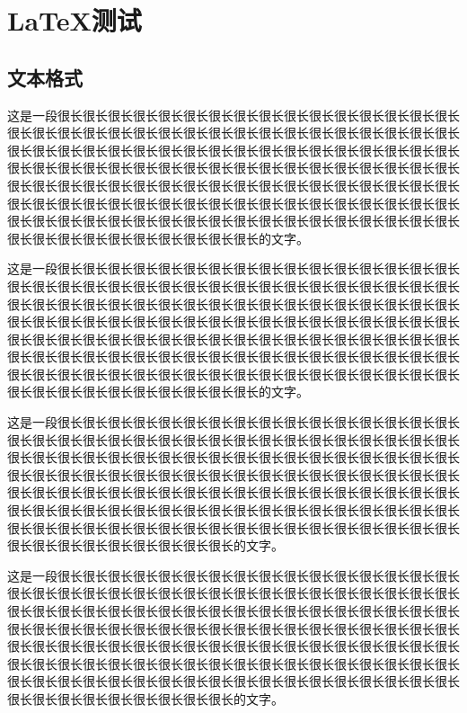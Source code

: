\chapter{\LaTeX 测试}
\section{文本格式}
这是一段很长很长很长很长很长很长很长很长很长很长很长很长很长很长很长很长很长很长很长很长很长很长很长很长很长很长很长很长很长很长很长很长很长很长很长很长很长很长很长很长很长很长很长很长很长很长很长很长很长很长很长很长很长很长很长很长很长很长很长很长很长很长很长很长很长很长很长很长很长很长很长很长很长很长很长很长很长很长很长很长很长很长很长很长很长很长很长很长很长很长很长很长很长很长很长很长很长很长很长很长很长很长很长很长很长很长很长很长很长很长很长很长很长很长很长很长很长很长很长很长很长很长很长很长很长很长很长很长很长很长很长很长很长很长的文字。

这是一段很长很长很长很长很长很长很长很长很长很长很长很长很长很长很长很长很长很长很长很长很长很长很长很长很长很长很长很长很长很长很长很长很长很长很长很长很长很长很长很长很长很长很长很长很长很长很长很长很长很长很长很长很长很长很长很长很长很长很长很长很长很长很长很长很长很长很长很长很长很长很长很长很长很长很长很长很长很长很长很长很长很长很长很长很长很长很长很长很长很长很长很长很长很长很长很长很长很长很长很长很长很长很长很长很长很长很长很长很长很长很长很长很长很长很长很长很长很长很长很长很长很长很长很长很长很长很长很长很长很长很长很长很长很长的文字。

这是一段很长很长很长很长很长很长很长很长很长很长很长很长很长很长很长很长很长很长很长很长很长很长很长很长很长很长很长很长很长很长很长很长很长很长很长很长很长很长很长很长很长很长很长很长很长很长很长很长很长很长很长很长很长很长很长很长很长很长很长很长很长很长很长很长很长很长很长很长很长很长很长很长很长很长很长很长很长很长很长很长很长很长很长很长很长很长很长很长很长很长很长很长很长很长很长很长很长很长很长很长很长很长很长很长很长很长很长很长很长很长很长很长很长很长很长很长很长很长很长很长很长很长很长很长很长很长很长很长很长很长很长很长很长的文字。

这是一段很长很长很长很长很长很长很长很长很长很长很长很长很长很长很长很长很长很长很长很长很长很长很长很长很长很长很长很长很长很长很长很长很长很长很长很长很长很长很长很长很长很长很长很长很长很长很长很长很长很长很长很长很长很长很长很长很长很长很长很长很长很长很长很长很长很长很长很长很长很长很长很长很长很长很长很长很长很长很长很长很长很长很长很长很长很长很长很长很长很长很长很长很长很长很长很长很长很长很长很长很长很长很长很长很长很长很长很长很长很长很长很长很长很长很长很长很长很长很长很长很长很长很长很长很长很长很长很长很长很长很长很长很长的文字。


